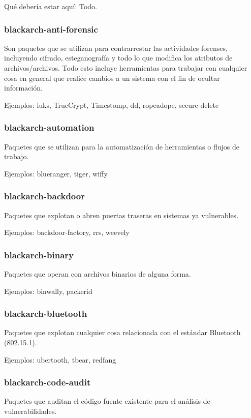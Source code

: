 \documentclass[a4paper, oneside, 11pt]{book}
\begin{document}
Qu\'e deber\'ia estar aqu\'i: Todo.

\subsubsection{blackarch-anti-forensic}
Son paquetes que se utilizan para contrarrestar las actividades forenses,
incluyendo cifrado, esteganograf\'ia y todo lo que modifica los atributos de archivos/archivos.
Todo esto incluye herramientas para trabajar con cualquier cosa en general que realice cambios a un sistema con
el fin de ocultar informaci\'on.

Ejemplos: luks, TrueCrypt, Timestomp, dd, ropeadope, secure-delete

\subsubsection{blackarch-automation}
Paquetes que se utilizan para la automatizaci\'on de herramientas o flujos de trabajo.

Ejemplos: blueranger, tiger, wiffy

\subsubsection{blackarch-backdoor}
Paquetes que explotan o abren puertas traseras en sistemas ya vulnerables.

Ejemplos: backdoor-factory, rrs, weevely

\subsubsection{blackarch-binary}
Paquetes que operan con archivos binarios de alguna forma.

Ejemplos: binwally, packerid

\subsubsection{blackarch-bluetooth}
Paquetes que explotan cualquier cosa relacionada con el est\'andar Bluetooth (802.15.1).

Ejemplos: ubertooth, tbear, redfang

\subsubsection{blackarch-code-audit}
Paquetes que auditan el c\'odigo fuente existente para el an\'alisis de vulnerabilidades.
\end{document}
